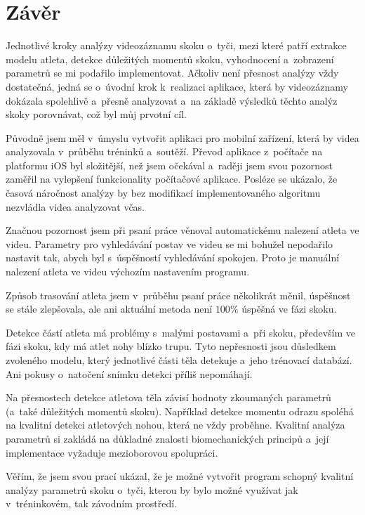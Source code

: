 \chapter*{Závěr}

Jednotlivé kroky analýzy videozáznamu skoku o~tyči, mezi které patří extrakce modelu atleta, detekce důležitých momentů skoku, vyhodnocení a~zobrazení parametrů se mi podařilo implementovat. Ačkoliv není přesnost analýzy vždy dostatečná, jedná se o~úvodní krok k~realizaci aplikace, která by videozáznamy dokázala spolehlivě a~přesně analyzovat a~na základě výsledků těchto analýz skoky porovnávat, což byl můj prvotní cíl.

Původně jsem měl v~úmyslu vytvořit aplikaci pro mobilní zařízení, která by videa analyzovala v~průběhu tréninků a~soutěží. Převod aplikace z~počítače na platformu iOS byl složitější, než jsem očekával a~raději jsem svou pozornost zaměřil na vylepšení funkcionality počítačové aplikace. Posléze se ukázalo, že časová náročnost analýzy by bez modifikací implementovaného algoritmu nezvládla videa analyzovat včas.

Značnou pozornost jsem při psaní práce věnoval automatickému nalezení atleta ve videu. Parametry pro vyhledávání postav ve videu se mi bohužel nepodařilo nastavit tak, abych byl s~úspěšností vyhledávání spokojen. Proto je manuální nalezení atleta ve videu výchozím nastavením programu.

Způsob trasování atleta jsem v~průběhu psaní práce několikrát měnil, úspěšnost se stále zlepšovala, ale ani aktuální metoda není $100\%$ úspěšná ve fázi skoku.

Detekce částí atleta má problémy s~malými postavami a~při skoku, především ve fázi skoku, kdy má atlet nohy blízko trupu. Tyto nepřesnosti jsou důsledkem zvoleného modelu, který jednotlivé části těla detekuje a~jeho trénovací databází. Ani pokusy o~natočení snímku detekci příliš nepomáhají.

Na přesnostech detekce atletova těla závisí hodnoty zkoumaných parametrů (a~také důležitých momentů skoku). Například detekce momentu odrazu spoléhá na kvalitní detekci atletových nohou, která ne vždy proběhne. Kvalitní analýza parametrů si zakládá na důkladné znalosti biomechanických principů a~její implementace vyžaduje mezioborovou spolupráci.

Věřím, že jsem svou prací ukázal, že je možné vytvořit program schopný kvalitní analýzy parametrů skoku o~tyči, kterou by bylo možné využívat jak v~tréninkovém, tak závodním prostředí.


















































